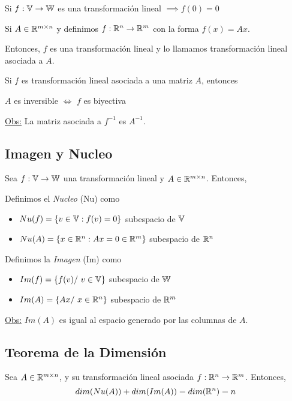 \begin{teo}
	Si $f: \mathbb{V} \to \mathbb{W}$ es una transformación lineal $\implies f(0) = 0$
\end{teo}

\begin{teo}
	Si $A \in\mathbb{R}^{m\times n}$ y definimos $f: \mathbb{R}^{n} \to \mathbb{R}^{m}$ con la forma $f(x) = Ax$.

	Entonces, $f$ es una transformación lineal y lo llamamos transformación lineal
	asociada a $A$.
\end{teo}

\begin{propi}
	Si $f$ es transformación lineal asociada a una matriz $A$, entonces
	\begin{center}
		$A$ es inversible $\iff$ $f$ es biyectiva
	\end{center}
	\underline{Obs:} La matriz asociada a $f^{-1}$ es $A^{-1}$.
\end{propi}

\subsection{Imagen y Nucleo}
Sea $f: \mathbb{V} \to \mathbb{W}$ una transformación lineal y $A \in\mathbb{R}^{m\times n}$. Entonces,

\begin{defi} Definimos el \textit{Nucleo} (Nu) como
	\begin{itemize}
		\item $Nu(f) = \{v \in \mathbb{V} : f(v) = 0\}$ subespacio de $\mathbb{V}$
		\item $Nu(A) = \{x \in \mathbb{R}^{n} : Ax = 0 \in \mathbb{R}^{m}\}$ subespacio de $\mathbb{R}^{n}$
	\end{itemize}
\end{defi}

\begin{defi} Definimos la \textit{Imagen} (Im) como
	\begin{itemize}
		\item $Im(f) = \{f(v) /\ v \in \mathbb{V}\}$ subespacio de $\mathbb{W}$
		\item $Im(A) = \{Ax /\ x \in \mathbb{R}^{n}\}$ subespacio de $\mathbb{R}^{m}$
	\end{itemize}
\end{defi}

\underline{Obs:} $Im(A)$ es igual al espacio generado por las columnas de $A$.

\subsection{Teorema de la Dimensión}
\begin{teo} Sea $A \in\mathbb{R}^{m\times n}$, y su transformación lineal asociada $f: \mathbb{R}^{n} \to \mathbb{R}^{m}$. Entonces,
	$$dim(Nu(A)) + dim(Im(A)) = dim(\mathbb{R}^{n}) = n$$
\end{teo}

